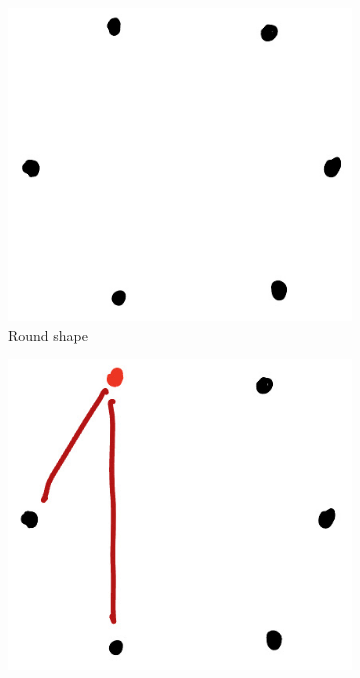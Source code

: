 \begin{figure}[ht]
  \begin{center}
    \hfill
    \begin{subfigure}{0.23\textwidth}
      \includegraphics[width=\textwidth]{figures/l02/l02-step1}
      \caption{Round shape}
    \end{subfigure}
    \hfill
    \begin{subfigure}{0.23\textwidth}
      \includegraphics[width=\textwidth]{figures/l02/l02-step2}

\end{subfigure}
\end{center}
\end{figure}
